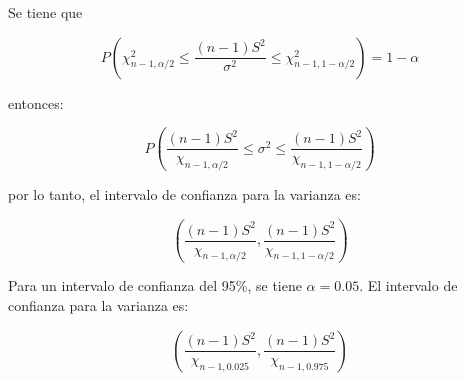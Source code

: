 \begin{enumerate}
          Se tiene que

          \begin{equation*}
              P(\chi_{n-1,\alpha/2}^2\leq \frac{(n-1)S^2}{\sigma^2}\leq \chi_{n-1,1-\alpha/2}^2) = 1-\alpha
          \end{equation*}


          entonces:

          \begin{equation*}
              P\left (\frac{(n-1)S^2}{\chi_{n-1,\alpha/2}} \leq \sigma^2 \leq \frac{(n-1)S^2}{\chi_{n-1,1-\alpha/2}} \right )
          \end{equation*}

          por lo tanto, el intervalo de confianza para la varianza es:

          \begin{equation*}
              \left (\frac{(n-1)S^2}{\chi_{n-1,\alpha/2}},\frac{(n-1)S^2}{\chi_{n-1,1-\alpha/2}}\right )
          \end{equation*}

          Para un intervalo de confianza del 95\%, se tiene $\alpha = 0.05$. El intervalo de confianza para la varianza es:

          \begin{equation*}
              \left (\frac{(n-1)S^2}{\chi_{n-1,0.025}},\frac{(n-1)S^2}{\chi_{n-1,0.975}}\right )
          \end{equation*}
\end{enumerate}